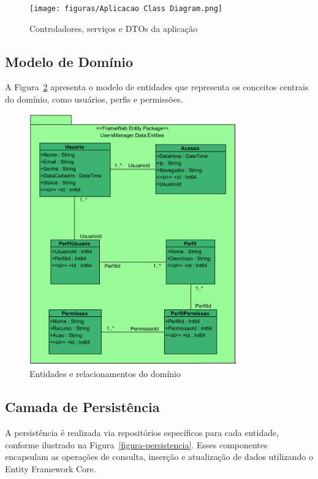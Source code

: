\begin{figure}[H]
    \centering
    \texttt{[image: figuras/Aplicacao Class Diagram.png]}
    \caption{Controladores, serviços e DTOs da aplicação}
    \label{figura-aplicacao}
\end{figure}

\subsection{Modelo de Domínio}

A Figura~\ref{figura-entidades} apresenta o modelo de entidades que representa os conceitos centrais do domínio, como usuários, perfis e permissões.

\begin{figure}[H]
    \centering
    \includegraphics[width=0.8\textwidth]{figuras/Entidades Class Diagram.png}
    \caption{Entidades e relacionamentos do domínio}
    \label{figura-entidades}
\end{figure}

\subsection{Camada de Persistência}

A persistência é realizada via repositórios específicos para cada entidade, conforme ilustrado na Figura~\ref{figura-persistencia}. Esses componentes encapsulam as operações de consulta, inserção e atualização de dados utilizando o Entity Framework Core.

